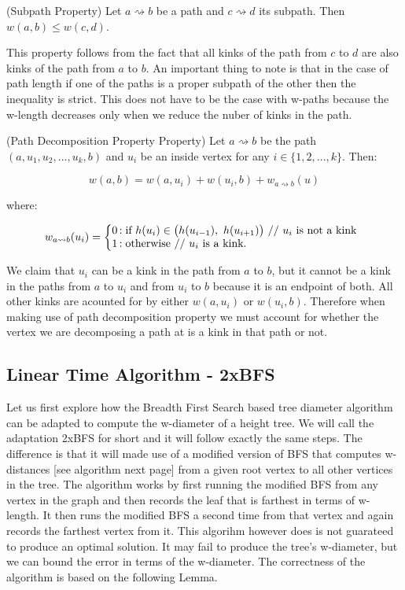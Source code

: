\begin{defn} (Subpath Property) Let $a \rightsquigarrow b$ be a path and $c \rightsquigarrow d$ its subpath. Then $w(a, b) \le w(c, d)$. \end{defn}

This property follows from the fact that all kinks of the path from $c$ to $d$ are also kinks of the path from $a$ to $b$. An important thing to note is that in the case of path length if one of the paths is a proper subpath of the other then the inequality is strict. This does not have to be the case with w-paths because the w-length decreases only when we reduce the nuber of kinks in the path.

\begin{defn} (Path Decomposition Property Property) Let $a \rightsquigarrow b$ be the path $(a, u_1, u_2, ..., u_k, b)$ and $u_i$ be an inside vertex for any $i \in \{1, 2, ..., k\}$. Then: \end{defn}

    $$w(a, b) = w(a, u_i) + w(u_i, b) + w_{a \rightsquigarrow b}(u)$$

   where:

   $$
   w_{a \rightsquigarrow b}(u_i) = \left\{
       \begin{array}{@{}l@{\thinspace}l}
           \text{0}  &: \text{if } h(u_i) \in \big(h(u_{i-1}),~h(u_{i+1}) \big) \text{ // $u_i$ is not a kink} \\
           \text{1} &: \text{otherwise // $u_i$ is a kink.} \\
       \end{array}
   \right.
   $$

We claim that $u_i$ can be a kink in the path from $a$ to $b$, but it cannot be a kink in the paths from $a$ to $u_i$ and from $u_i$ to $b$ because it is an endpoint of both. All other kinks are acounted for by either $w(a, u_i)$ or $w(u_i, b)$. Therefore when making use of path decomposition property we must account for whether the vertex we are decomposing a path at is a kink in that path or not.


\subsection{Linear Time Algorithm - 2xBFS}

Let us first explore how the Breadth First Search based tree diameter algorithm can be adapted to compute the w-diameter of a height tree. We will call the adaptation 2xBFS for short and it will follow exactly the same steps. The difference is that it will made use of a modified version of BFS that computes w-distances [see algorithm next page] from a given root vertex to all other vertices in the tree. The algorithm works by first running the modified BFS from any vertex in the graph and then records the leaf that is farthest in terms of w-length. It then runs the modified BFS a second time from that vertex and again records the farthest vertex from it. This algorihm however does is not guarateed to produce an optimal solution. It may fail to produce the tree's w-diameter, but we can bound the error in terms of the w-diameter. The correctness of the algorithm is based on the following Lemma.

